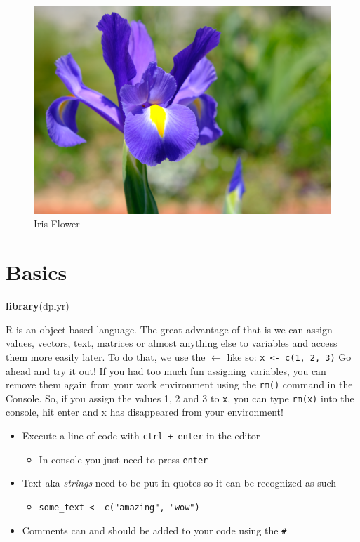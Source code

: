 \documentclass[
]{book}
\newenvironment{Shaded}{\begin{snugshade}}{\end{snugshade}}
\newcommand{\FunctionTok}[1]{\textcolor[rgb]{0.13,0.29,0.53}{\textbf{#1}}}
\newcommand{\NormalTok}[1]{#1}
\providecommand{\tightlist}{%
  \setlength{\itemsep}{0pt}\setlength{\parskip}{0pt}}
\begin{document}
\begin{figure}
\centering
\includegraphics{img/iris.png}
\caption{Iris Flower}
\end{figure}

\section{Basics}\label{basics}

\begin{Shaded}
\begin{Highlighting}[]
\FunctionTok{library}\NormalTok{(dplyr)}
\end{Highlighting}
\end{Shaded}

R is an object-based language.
The great advantage of that is we can assign values, vectors, text, matrices or almost anything else to variables and access them more easily later.
To do that, we use the \(\leftarrow\) like so: \newline
\texttt{x\ \textless{}-\ c(1,\ 2,\ 3)}
Go ahead and try it out!
If you had too much fun assigning variables, you can remove them again from your work environment using the \texttt{rm()} command in the Console.
So, if you assign the values 1, 2 and 3 to \texttt{x}, you can type \texttt{rm(x)} into the console, hit enter and x has disappeared from your environment!

\begin{itemize}
\tightlist
\item
  Execute a line of code with \texttt{ctrl\ +\ enter} in the editor

  \begin{itemize}
  \tightlist
  \item
    In console you just need to press \texttt{enter}
  \end{itemize}
\item
  Text aka \emph{strings} need to be put in quotes so it can be recognized as such

  \begin{itemize}
  \tightlist
  \item
    \texttt{some\_text\ \textless{}-\ c("amazing",\ "wow")}
  \end{itemize}
\item
  Comments can and should be added to your code using the \texttt{\#}
\end{itemize}
\end{document}
